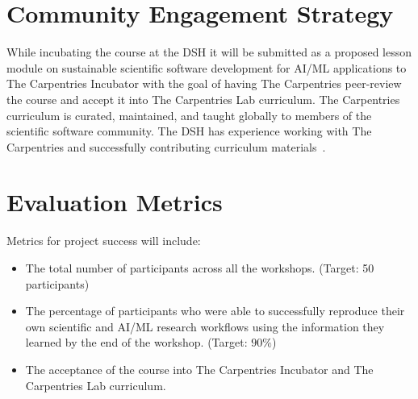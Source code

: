 \documentclass[letterpaper, 11pt]{article}
\begin{document}
\section{Community Engagement Strategy}


While incubating the course at the DSH it will be submitted as a proposed lesson module on sustainable scientific software development for AI/ML applications to The Carpentries Incubator with the goal of having The Carpentries peer-review the course and accept it into The Carpentries Lab curriculum.
The Carpentries curriculum is curated, maintained, and taught globally to members of the scientific software community.
The DSH has experience working with The Carpentries and successfully contributing curriculum materials~\cite{backhaus_2024_14360351}.

\section{Evaluation Metrics}



Metrics for project success will include:
\begin{itemize}[noitemsep]
  \item The total number of participants across all the workshops. (Target: 50 participants)
  \item The percentage of participants who were able to successfully reproduce their own scientific and AI/ML research workflows using the information they learned by the end of the workshop. (Target: $90\%$)
  \item The acceptance of the course into The Carpentries Incubator and The Carpentries Lab curriculum.
\end{itemize}
\end{document}
